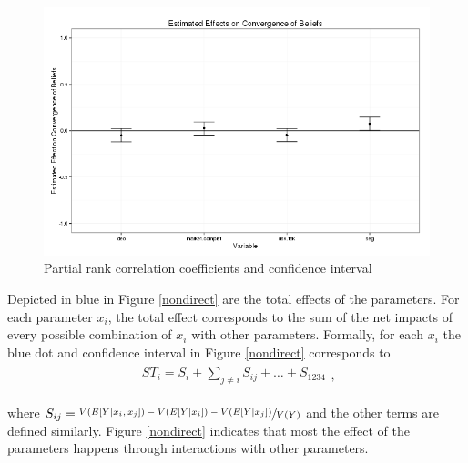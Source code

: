 \documentclass{sig-alternate}
\begin{document}
	\begin{figure}
		\begin{center}
			\includegraphics[scale = 0.5]{pc_sa.png}
			\caption{Partial rank correlation coefficients and confidence interval \label{prcc}}
		\end{center}
	\end{figure}
	
	 Depicted in blue in Figure \ref{nondirect} are the total effects of the parameters. For each parameter $x_i$, the total effect corresponds to the sum of the net impacts of every possible combination of $x_i$ with other parameters. Formally, for each $x_i$ the blue dot and confidence interval in Figure \ref{nondirect} corresponds to
	 \begin{align}
	 \begin{split}
ST_i =  S_i  + \sum_{j\neq i}  S_{ij} + \dots +  S_{1234} 
 \end{split},
	 \end{align}
	 
	where  $S_{ij} = \sfrac{ V(E[Y|x_i,x_j]) - \allowbreak V(E[Y|x_i])- V(E[Y|x_j])}{V(Y)}$ and the other terms are defined similarly. Figure \ref{nondirect} indicates that most the effect of the parameters happens through interactions with other parameters.
\end{document}
